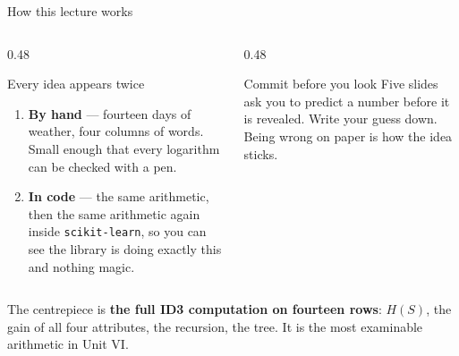 \documentclass[aspectratio=169]{beamer}
\begin{document}
\begin{frame}[shrink=6]{How this lecture works}
  \begin{columns}[T]
    \begin{column}{0.48\textwidth}
      \begin{block}{Every idea appears twice}
        \begin{enumerate}
          \item \textbf{By hand} --- fourteen days of weather, four columns of
            words. Small enough that every logarithm can be checked with a
            pen.
          \item \textbf{In code} --- the same arithmetic, then the same
            arithmetic again inside \texttt{scikit-learn}, so you can see the
            library is doing exactly this and nothing magic.
        \end{enumerate}
      \end{block}
    \end{column}
    \begin{column}{0.48\textwidth}
      \begin{alertblock}{Commit before you look}
        Five slides ask you to predict a number before it is revealed. Write
        your guess down. Being wrong on paper is how the idea sticks.
      \end{alertblock}
    \end{column}
  \end{columns}
  \vspace{0.4em}
  \begin{center}
    \small The centrepiece is \textbf{the full ID3 computation on fourteen
    rows}: $H(S)$, the gain of all four attributes, the recursion, the tree.
    It is the most examinable arithmetic in Unit VI.
  \end{center}
\end{frame}
\end{document}
